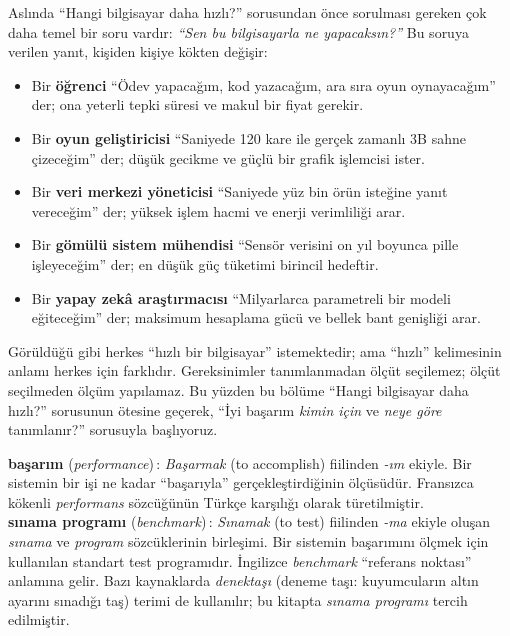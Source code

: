 Aslında ``Hangi bilgisayar daha hızlı?'' sorusundan önce sorulması gereken çok daha temel bir soru vardır: \emph{``Sen bu bilgisayarla ne yapacaksın?''} Bu soruya verilen yanıt, kişiden kişiye kökten değişir:
\begin{itemize}[nosep]
    \item Bir \textbf{öğrenci} ``Ödev yapacağım, kod yazacağım, ara sıra oyun oynayacağım'' der; ona yeterli tepki süresi ve makul bir fiyat gerekir.
    \item Bir \textbf{oyun geliştiricisi} ``Saniyede 120 kare ile gerçek zamanlı 3B sahne çizeceğim'' der; düşük gecikme ve güçlü bir grafik işlemcisi ister.
    \item Bir \textbf{veri merkezi yöneticisi} ``Saniyede yüz bin örün isteğine yanıt vereceğim'' der; yüksek işlem hacmi ve enerji verimliliği arar.
    \item Bir \textbf{gömülü sistem mühendisi} ``Sensör verisini on yıl boyunca pille işleyeceğim'' der; en düşük güç tüketimi birincil hedeftir.
    \item Bir \textbf{yapay zekâ araştırmacısı} ``Milyarlarca parametreli bir modeli eğiteceğim'' der; maksimum hesaplama gücü ve bellek bant genişliği arar.
\end{itemize}
Görüldüğü gibi herkes ``hızlı bir bilgisayar'' istemektedir; ama ``hızlı'' kelimesinin anlamı herkes için farklıdır. Gereksinimler tanımlanmadan ölçüt seçilemez; ölçüt seçilmeden ölçüm yapılamaz. Bu yüzden bu bölüme ``Hangi bilgisayar daha hızlı?'' sorusunun ötesine geçerek, ``İyi başarım \emph{kimin için} ve \emph{neye göre} tanımlanır?'' sorusuyla başlıyoruz.

\begin{terimnotu}
\textbf{başarım} (\emph{performance})\,: \emph{Başarmak} (to accomplish) fiilinden \emph{-ım} ekiyle. Bir sistemin bir işi ne kadar ``başarıyla'' gerçekleştirdiğinin ölçüsüdür. Fransızca kökenli \emph{performans} sözcüğünün Türkçe karşılığı olarak türetilmiştir.\\[4pt]
\textbf{sınama programı} (\emph{benchmark})\,: \emph{Sınamak} (to test) fiilinden \emph{-ma} ekiyle oluşan \emph{sınama} ve \emph{program} sözcüklerinin birleşimi. Bir sistemin başarımını ölçmek için kullanılan standart test programıdır. İngilizce \emph{benchmark} ``referans noktası'' anlamına gelir. Bazı kaynaklarda \emph{denektaşı} (deneme taşı: kuyumcuların altın ayarını sınadığı taş) terimi de kullanılır; bu kitapta \emph{sınama programı} tercih edilmiştir.
\end{terimnotu}

